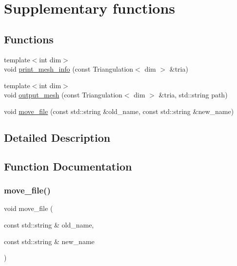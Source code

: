 \section{Supplementary functions}
\label{group___supplementary}
\subsection*{Functions}
\begin{DoxyCompactItemize}
\item 
{\footnotesize template$<$int dim$>$ }\\void \mbox{\hyperlink{group___supplementary_ga2971a293263dddc17f3df81add2ffbbe}{print\+\_\+mesh\+\_\+info}} (const Triangulation$<$ dim $>$ \&tria)
\item 
{\footnotesize template$<$int dim$>$ }\\void \mbox{\hyperlink{group___supplementary_ga0272b346b175b931e89b017fd93b5b80}{output\+\_\+mesh}} (const Triangulation$<$ dim $>$ \&tria, std\+::string path)
\item 
void \mbox{\hyperlink{group___supplementary_gae0eb2d2afc3e33a9bb3b409b0171c470}{move\+\_\+file}} (const std\+::string \&old\+\_\+name, const std\+::string \&new\+\_\+name)
\end{DoxyCompactItemize}


\subsection{Detailed Description}


\subsection{Function Documentation}
\mbox{\label{group___supplementary_gae0eb2d2afc3e33a9bb3b409b0171c470}} 
\subsubsection{\texorpdfstring{move\+\_\+file()}{move\_file()}}
{\footnotesize\ttfamily void move\+\_\+file (\begin{DoxyParamCaption}\item[{const std\+::string \&}]{old\+\_\+name,  }\item[{const std\+::string \&}]{new\+\_\+name }\end{DoxyParamCaption})}

